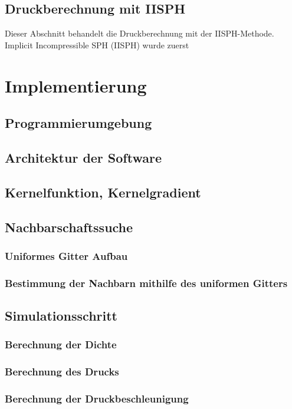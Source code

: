 \documentclass{scrreprt}
\begin{document}
\section{Druckberechnung mit IISPH}
Dieser Abschnitt behandelt die Druckberechnung mit der IISPH-Methode. Implicit Incompressible SPH (IISPH) wurde zuerst 
\chapter{Implementierung}
\section{Programmierumgebung}
\section{Architektur der Software}
\section{Kernelfunktion, Kernelgradient}
\section{Nachbarschaftssuche}
\subsection{Uniformes Gitter Aufbau}
\subsection{Bestimmung der Nachbarn mithilfe des uniformen Gitters}
\subsection{}
\section{Simulationsschritt}
\subsection{Berechnung der Dichte}
\subsection{Berechnung des Drucks}
\subsection{Berechnung der Druckbeschleunigung}
\end{document}
